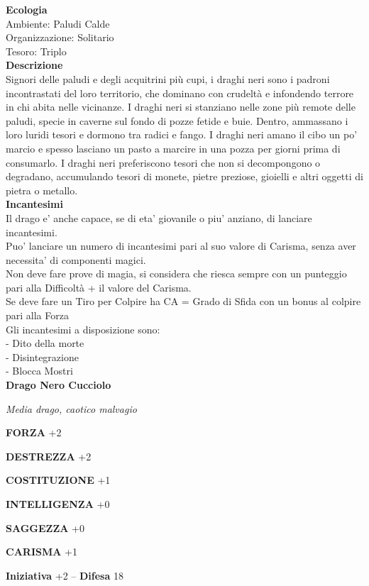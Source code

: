 \begin{multicols}{2}
\textbf{Ecologia}\\
Ambiente: Paludi Calde\\
Organizzazione: Solitario\\
Tesoro: Triplo\\
\textbf{Descrizione}\\
Signori delle paludi e degli acquitrini più cupi, i draghi neri sono i padroni incontrastati del loro territorio, che dominano con crudeltà e infondendo terrore in chi abita nelle vicinanze. I draghi neri si stanziano nelle zone più remote delle paludi, specie in caverne sul fondo di pozze fetide e buie. Dentro, ammassano i loro luridi tesori e dormono tra radici e fango. I draghi neri amano il cibo un po' marcio e spesso lasciano un pasto a marcire in una pozza per giorni prima di consumarlo. I draghi neri preferiscono tesori che non si decompongono o degradano, accumulando tesori di monete, pietre preziose, gioielli e altri oggetti di pietra o metallo.\\
\textbf{Incantesimi}\\
Il drago e' anche capace, se di eta' giovanile o piu' anziano, di lanciare incantesimi.\\
Puo' lanciare un numero di incantesimi pari al suo valore di Carisma, senza aver necessita' di componenti magici.\\
Non deve fare prove di magia, si considera che riesca sempre con un punteggio pari alla Difficoltà + il valore del Carisma.\\
Se deve fare un Tiro per Colpire ha CA = Grado di Sfida con un bonus al colpire pari alla Forza\\
Gli incantesimi a disposizione sono:\\
- Dito della morte\\
- Disintegrazione\\
- Blocca Mostri\\


\medskip{}\textbf{Drago Nero Cucciolo}

\emph{Media drago, caotico malvagio}

\textbf{FORZA} +2

\textbf{DESTREZZA} +2

\textbf{COSTITUZIONE} +1

\textbf{INTELLIGENZA} +0

\textbf{SAGGEZZA} +0

\textbf{CARISMA} +1

\textbf{Iniziativa} +2 -- \textbf{Difesa} 18


\end{multicols}
